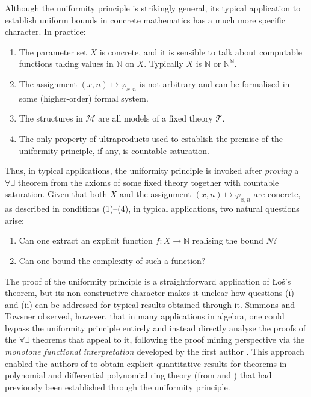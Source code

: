 \documentclass[11pt]{amsart}
\theoremstyle{definition}
\theoremstyle{remark}
\def\NN{\mathbb{N}}
\begin{document}
Although the uniformity principle is strikingly general, its typical application to establish uniform bounds in concrete mathematics has a much more specific character. In practice:
\begin{enumerate}
  \item The parameter set $X$ is concrete, and it is sensible to talk about computable functions taking values in $\NN$ on $X$. Typically $X$ is $\NN$ or $\NN^\NN$.
  \item The assignment $(x,n) \mapsto \varphi_{x,n}$ is not arbitrary and
        can be formalised in some (higher-order) formal system.
  \item The structures in $\mathscr{M}$ are all models of a fixed theory
        $\mathcal{T}$.
  \item The only property of ultraproducts used to establish the premise of
        the uniformity principle, if any, is countable saturation.
\end{enumerate}
Thus, in typical applications, the uniformity principle is invoked after \emph{proving} a $\forall\exists$ theorem from the axioms of some fixed theory together with countable saturation. Given that both $X$ and the assignment $(x,n)\mapsto\varphi_{x,n}$ are concrete, as described in conditions (1)--(4), in typical applications, two natural questions arise:
\begin{enumerate}
  \item[(i)]  Can one extract an explicit function $f\colon X\to\NN$
              realising the bound $N$?
  \item[(ii)] Can one bound the complexity of such a function?
\end{enumerate}
The proof of the uniformity principle is a straightforward application of \L o\'s's theorem, but its non-constructive character makes it unclear how questions (i) and (ii) can be addressed for typical results obtained through it. Simmons and Towsner \cite{simmons2019proof} observed, however, that in many applications in algebra, one could bypass the uniformity principle entirely and instead directly analyse the proofs of the $\forall\exists$ theorems that appeal to it, following the proof mining perspective via the \emph{monotone functional interpretation} developed by the first author \cite{Kohlenbach2008}. This approach enabled the authors of \cite{simmons2019proof} to obtain explicit quantitative results for theorems in polynomial and differential polynomial ring theory (from \cite{van1984bounds} and \cite{harrison2012nonstandard}) that had previously been established through the uniformity principle.
\end{document}
